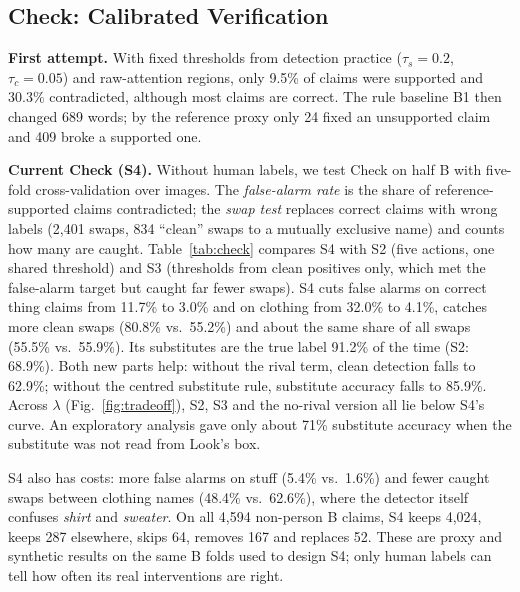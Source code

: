 \documentclass[conference]{IEEEtran}
\begin{document}
\subsection{Check: Calibrated Verification}
\label{sec:exp-check}
\textbf{First attempt.} With fixed thresholds from detection practice ($\tau_s=0.2$, $\tau_c=0.05$) and
raw-attention regions, only 9.5\% of claims were supported and 30.3\% contradicted, although most claims are
correct. The rule baseline B1 then changed 689 words; by the reference proxy only 24 fixed an unsupported claim
and 409 broke a supported one.

\textbf{Current Check (S4).} Without human labels, we test Check on half B with five-fold cross-validation over
images. The \emph{false-alarm rate} is the share of reference-supported claims contradicted; the \emph{swap
test} replaces correct claims with wrong labels (2,401 swaps, 834 ``clean'' swaps to a mutually exclusive name)
and counts how many are caught. Table~\ref{tab:check} compares S4 with S2 (five actions, one shared threshold)
and S3 (thresholds from clean positives only, which met the false-alarm target but caught far fewer swaps).
S4 cuts false alarms on correct thing claims from 11.7\% to 3.0\% and on clothing from 32.0\% to 4.1\%, catches
more clean swaps (80.8\% vs.\ 55.2\%) and about the same share of all swaps (55.5\% vs.\ 55.9\%). Its
substitutes are the true label 91.2\% of the time (S2: 68.9\%). Both new parts help: without the rival term,
clean detection falls to 62.9\%; without the centred substitute rule, substitute accuracy falls to 85.9\%.
Across $\lambda$ (Fig.~\ref{fig:tradeoff}), S2, S3 and the no-rival version all lie below S4's curve. An
exploratory analysis gave only about 71\% substitute accuracy when the substitute was not read from Look's box.

S4 also has costs: more false alarms on stuff (5.4\% vs.\ 1.6\%) and fewer caught swaps between clothing names
(48.4\% vs.\ 62.6\%), where the detector itself confuses \emph{shirt} and \emph{sweater}. On all 4,594
non-person B claims, S4 keeps 4,024, keeps 287 elsewhere, skips 64, removes 167 and replaces 52. These are proxy
and synthetic results on the same B folds used to design S4; only human labels can tell how often its real
interventions are right.
\end{document}
